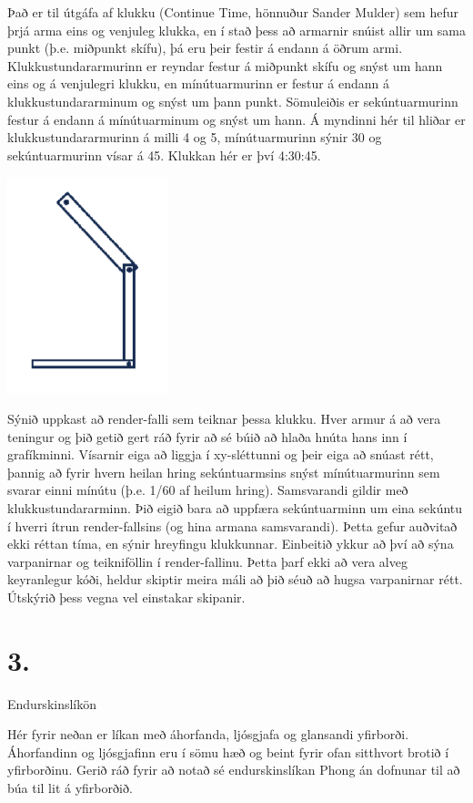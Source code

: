 \documentclass{article}
\begin{document}
Það er til útgáfa af klukku (Continue Time, hönnuður Sander Mulder) sem hefur
þrjá arma eins og venjuleg klukka, en í stað þess að armarnir
snúist allir um sama punkt (þ.e. miðpunkt skífu), þá eru þeir
festir á endann á öðrum armi. Klukkustundararmurinn er
reyndar festur á miðpunkt skífu og snýst um hann eins og á
venjulegri klukku, en mínútuarmurinn er festur á endann á
klukkustundararminum og snýst um þann punkt. Sömuleiðis
er sekúntuarmurinn festur á endann á mínútuarminum og
snýst um hann. Á myndinni hér til hliðar er
klukkustundararmurinn á milli 4 og 5, mínútuarmurinn sýnir
30 og sekúntuarmurinn vísar á 45. Klukkan hér er því
4:30:45.

\includegraphics[scale = 0.9]{klukka.png}

Sýnið uppkast að render-falli sem teiknar þessa klukku. Hver armur á að vera
teningur og þið getið gert ráð fyrir að sé búið að hlaða hnúta hans inn í
grafíkminni. Vísarnir eiga að liggja í xy-sléttunni og þeir eiga að snúast rétt,
þannig að fyrir hvern heilan hring sekúntuarmsins snýst mínútuarmurinn sem
svarar einni mínútu (þ.e. 1/60 af heilum hring). Samsvarandi gildir með
klukkustundararminn. Þið eigið bara að uppfæra sekúntuarminn um eina sekúntu í
hverri ítrun render-fallsins (og hina armana samsvarandi). Þetta gefur auðvitað
ekki réttan tíma, en sýnir hreyfingu klukkunnar.
Einbeitið ykkur að því að sýna varpanirnar og teikniföllin í render-fallinu. Þetta
þarf ekki að vera alveg keyranlegur kóði, heldur skiptir meira máli að þið séuð að
hugsa varpanirnar rétt. Útskýrið þess vegna vel einstakar skipanir.

\newpage

\section{3.} Endurskinslíkön

Hér fyrir neðan er líkan með áhorfanda, ljósgjafa og glansandi yfirborði.
Áhorfandinn og ljósgjafinn eru í sömu hæð og beint fyrir ofan sitthvort brotið í
yfirborðinu. Gerið ráð fyrir að notað sé endurskinslíkan Phong án dofnunar til að
búa til lit á yfirborðið.
\end{document}
